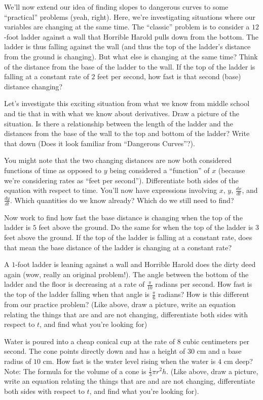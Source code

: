 \documentclass{ximera}
\begin{document}
\begin{exercise} 
We'll now extend our idea of finding slopes to dangerous curves to some ``practical'' problems (yeah, right).  Here, we're investigating situations where our variables are changing at the same time.  The ``classic'' problem is to consider a $12$-foot ladder against a wall that Horrible Harold pulls down from the bottom. The ladder is thus falling against the wall (and thus the top of the ladder's distance from the ground is changing).  But what else is changing at the same time?  Think of the distance from the base of the ladder to the wall.  If the top of the ladder is falling at a constant rate of $2$ feet per second, how fast is that second (base) distance changing? 

Let's investigate this exciting situation from what we know from middle school and tie that in with what we know about derivatives.  Draw a picture of the situation.  Is there a relationship between the length of the ladder and the distances from the base of the wall to the top and bottom of the ladder?  Write that down (Does it look familiar from ``Dangerous Curves''?).  

You might note that the two changing distances are now both considered functions of time as opposed to $y$ being considered a ``function'' of $x$ (because we're considering rates as ``feet per second'').  Differentiate both sides of the equation with respect to time.  You'll now have expressions involving $x$, $y$, $\frac{dx}{dt}$, and $\frac{dy}{dt}$.  Which quantities do we know already?  Which do we still need to find? 

Now work to find how fast the base distance is changing when the top of the ladder is $5$ feet above the ground.  Do the same for when the top of the ladder is $3$ feet above the ground.  If the top of the ladder is falling at a constant rate, does that mean the base distance of the ladder is changing at a constant rate?
\end{exercise} 
\begin{exercise} 
A $1$-foot ladder is leaning against a wall and Horrible Harold does the dirty deed again (wow, really an original problem!).  The angle between the bottom of the ladder and the floor is decreasing at a rate of $\frac{\pi}{10}$  radians per second.  How fast is the top of the ladder falling when that angle is  $\frac{\pi}{6}$ radians?  How is this different from our practice problem?   (Like above, draw a picture, write an equation relating the things that are and are not changing, differentiate both sides with respect to $t$, and find what you're looking for)
\end{exercise}
\begin{exercise}
Water is poured into a cheap conical cup at the rate of $8$ cubic centimeters per second.  The cone points directly down and has a height of $30$ cm and a base radius of $10$ cm.  How fast is the water level rising when the water is $4$ cm deep?  Note:  The formula for the volume of a cone is  $\frac{1}{3}\pi r^2 h$. (Like above, draw a picture, write an equation relating the things that are and are not changing, differentiate both sides with respect to $t$, and find what you’re looking for).
\end{exercise}
\end{document}
